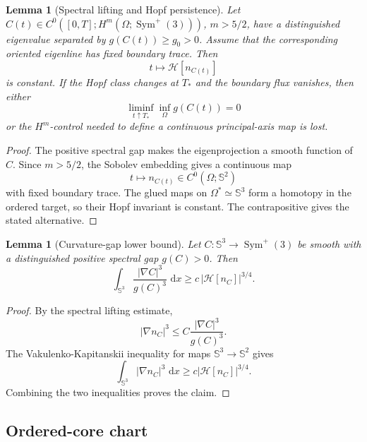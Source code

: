 \documentclass[11pt]{article}
\newtheorem{lemma}[theorem]{Lemma}
\theoremstyle{definition}
\newcommand{\Sph}{\mathbb S}
\newcommand{\dd}{\,\mathrm d}
\newcommand{\Hopf}{\mathcal H}
\begin{document}
\begin{lemma}[Spectral lifting and Hopf persistence]
\label{lem:short-spectral-lifting}
Let \(C(t)\in C^0([0,T];H^m(\Omega;\operatorname{Sym}^+(3)))\), \(m>5/2\),
have a distinguished eigenvalue separated by \(g(C(t))\ge g_0>0\).  Assume that
the corresponding oriented eigenline has fixed boundary trace.  Then
\[
        t\longmapsto \Hopf[n_{C(t)}]
\]
is constant.  If the Hopf class changes at \(T_\ast\) and the boundary flux
vanishes, then either
\[
        \liminf_{t\uparrow T_\ast}\inf_\Omega g(C(t))=0
\]
or the \(H^m\)-control needed to define a continuous principal-axis map is lost.
\end{lemma}

\begin{proof}
The positive spectral gap makes the eigenprojection a smooth function of
\(C\).  Since \(m>5/2\), the Sobolev embedding gives a continuous map
\[
        t\longmapsto n_{C(t)}\in C^0(\Omega;\Sph^2)
\]
with fixed boundary trace.  The glued maps on \(\Omega^\ast\simeq\Sph^3\) form
a homotopy in the ordered target, so their Hopf invariant is constant.  The
contrapositive gives the stated alternative.
\end{proof}

\begin{lemma}[Curvature-gap lower bound]
\label{lem:short-curvature-gap}
Let \(C:\Sph^3\to\operatorname{Sym}^+(3)\) be smooth with a distinguished
positive spectral gap \(g(C)>0\).  Then
\[
        \int_{\Sph^3}
        \frac{|\nabla C|^3}{g(C)^3}\,\dd x
        \ge
        c\,|\Hopf[n_C]|^{3/4}.
\]
\end{lemma}

\begin{proof}
By the spectral lifting estimate,
\[
        |\nabla n_C|^3
        \le
        C\frac{|\nabla C|^3}{g(C)^3}.
\]
The Vakulenko-Kapitanskii inequality for maps \(\Sph^3\to\Sph^2\) gives
\[
        \int_{\Sph^3}|\nabla n_C|^3\,\dd x
        \ge
        c|\Hopf[n_C]|^{3/4}.
\]
Combining the two inequalities proves the claim.
\end{proof}

\subsection{Ordered-core chart}
\end{document}
